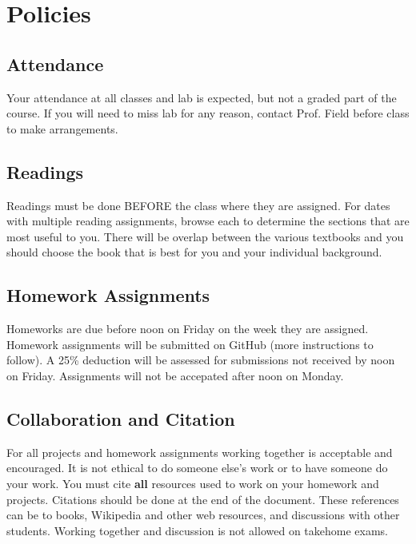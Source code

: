 \documentclass[11pt]{article} %
\begin{document}
\FloatBarrier



\section{Policies}

  \subsection{Attendance}
  
    Your attendance at all classes and lab is expected, but not a graded part of the course. If you will need to miss lab for any reason, contact Prof. Field before class to make arrangements.
  
  \subsection{Readings}
  
    Readings must be done BEFORE the class where they are assigned. For dates with multiple reading assignments, browse each to determine the sections that are most useful to you. There will be overlap between the various textbooks and you should choose the book that is best for you and your individual background.
  
  \subsection{Homework Assignments}
  
    Homeworks are due before noon on Friday on the week they are assigned.
    Homework assignments will be submitted on GitHub (more instructions to follow).
    A 25\% deduction will be assessed for submissions not received by noon on Friday. Assignments will not be accepated after noon on Monday.
  
  \subsection{Collaboration and Citation}
  
    For all projects and homework assignments working together is acceptable and encouraged. 
    It is not ethical to do someone else's work or to have someone do your work. 
    You must cite \textbf{all} resources used to work on your homework and projects. 
    Citations should be done at the end of the document. 
    These references can be to books, Wikipedia and other web resources, and discussions with other students. 
    Working together and discussion is not allowed on takehome exams.
  
\end{document}
